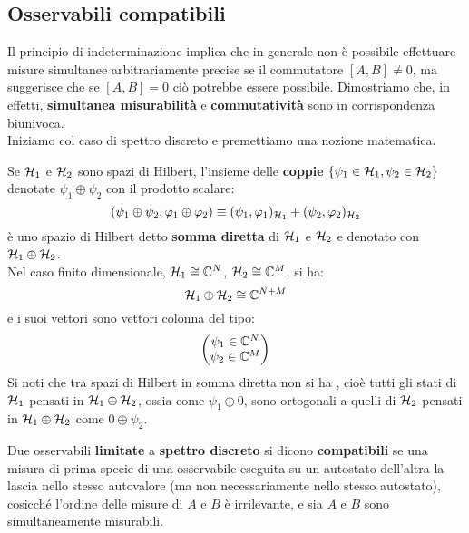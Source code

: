 \documentclass[../../FisicaTeorica.tex]{subfiles}
\begin{document}
\subsection{Osservabili compatibili}
Il principio di indeterminazione implica che in generale non è possibile effettuare misure simultanee arbitrariamente precise se il commutatore $[A,B]\neq 0$, ma suggerisce che se $[A,B]=0$ ciò potrebbe essere possibile. Dimostriamo che, in effetti, \textbf{simultanea misurabilità} e \textbf{commutatività} sono in corrispondenza biunivoca.\\
Iniziamo col caso di spettro discreto e premettiamo una nozione matematica.\\
\begin{dfn}
Se $\mathcal{H}_1$  e $\mathcal{H}_2$ sono spazi di Hilbert, l'insieme delle \textbf{coppie} $\{\psi_1 \in \mathcal{H}_1, \psi_2 \in \mathcal{H}_2\}$ denotate $\psi_1 \oplus \psi_2$ con il prodotto scalare:
\[
(\psi_1 \oplus \psi_2, \varphi_1 \oplus \varphi_2)\equiv (\psi_1, \varphi_1)_{\mathcal{H}_1} + (\psi_2, \varphi_2)_{\mathcal{H}_2}
\] 
è uno spazio di Hilbert detto \textbf{somma diretta} di $\mathcal{H}_1$ e $\mathcal{H}_2$ e denotato con $\mathcal{H}_1 \oplus \mathcal{H}_2$.\\
Nel caso finito dimensionale, $\mathcal{H}_1 \cong \mathbb{C}^N$, $\mathcal{H}_2 \cong \mathbb{C}^M$, si ha:
\[
\mathcal{H}_1 \oplus \mathcal{H}_2 \cong \mathbb{C}^{N+M}
\]
e i suoi vettori sono vettori colonna del tipo:
\[
\begin{pmatrix}
\psi_1 \in \mathbb{C}^N\\
\psi_2 \in \mathbb{C}^M
\end{pmatrix}
\]
Si noti che tra spazi di Hilbert in somma diretta non si ha , cioè tutti gli stati di $\mathcal{H}_1$ pensati in $\mathcal{H}_1 \oplus \mathcal{H}_2$, ossia come $\psi_1 \oplus 0$, sono ortogonali a quelli di $\mathcal{H}_2$ pensati in $\mathcal{H}_1\oplus \mathcal{H}_2$ come $0\oplus \psi_2$.
\end{dfn}

\begin{dfn}
Due osservabili \textbf{limitate} a \textbf{spettro discreto} si dicono \textbf{compatibili} se una misura di prima specie di una osservabile eseguita su un autostato dell'altra la lascia nello stesso autovalore (ma non necessariamente nello stesso autostato), cosicché l'ordine delle misure di $A$ e $B$ è irrilevante, e sia $A$ e $B$ sono simultaneamente misurabili. 
\end{dfn}
\end{document}
